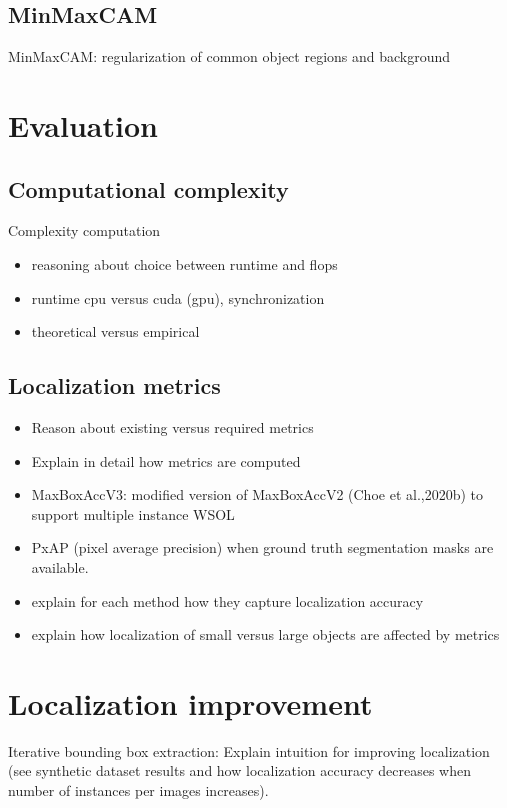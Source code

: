 \subsection{MinMaxCAM}
MinMaxCAM: regularization of common object regions and background

\section{Evaluation}
\subsection{Computational complexity}
Complexity computation
\begin{itemize}
    \item reasoning about choice between runtime and flops
    \item runtime cpu versus cuda (gpu), synchronization
    \item theoretical versus empirical
\end{itemize}

\subsection{Localization metrics}
\begin{itemize}
    \item Reason about existing versus required metrics
    \item Explain in detail how metrics are computed
    \item MaxBoxAccV3: modified version of MaxBoxAccV2 (Choe et al.,2020b) to support multiple instance WSOL
    \item PxAP (pixel average precision) when ground truth segmentation masks are available.
    \item explain for each method how they capture localization accuracy
    \item explain how localization of small versus large objects are affected by metrics
\end{itemize}

\section{Localization improvement}
Iterative bounding box extraction: Explain intuition for improving localization (see synthetic dataset results and how localization accuracy decreases when number of instances per images increases).

